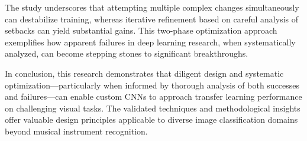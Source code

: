 The study underscores that attempting multiple complex changes simultaneously can destabilize training, whereas iterative refinement based on careful analysis of setbacks can yield substantial gains. This two-phase optimization approach exemplifies how apparent failures in deep learning research, when systematically analyzed, can become stepping stones to significant breakthroughs.

In conclusion, this research demonstrates that diligent design and systematic optimization—particularly when informed by thorough analysis of both successes and failures—can enable custom CNNs to approach transfer learning performance on challenging visual tasks. The validated techniques and methodological insights offer valuable design principles applicable to diverse image classification domains beyond musical instrument recognition.
